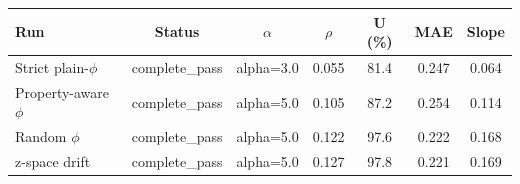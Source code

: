 \begin{tabular}{l c c c c c c}
\toprule
Run & Status & $\alpha$ & $\rho$ & U (\%) & MAE & Slope \\
\midrule
Strict plain-$\phi$ & complete\_pass & alpha=3.0 & 0.055 & 81.4 & 0.247 & 0.064 \\
Property-aware $\phi$ & complete\_pass & alpha=5.0 & 0.105 & 87.2 & 0.254 & 0.114 \\
Random $\phi$ & complete\_pass & alpha=5.0 & 0.122 & 97.6 & 0.222 & 0.168 \\
z-space drift & complete\_pass & alpha=5.0 & 0.127 & 97.8 & 0.221 & 0.169 \\
\bottomrule
\end{tabular}

